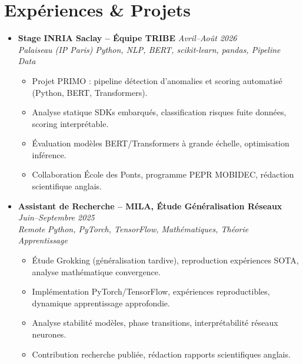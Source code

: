 \documentclass[a4paper,11pt]{article}
\begin{document}
\section{Exp\'eriences \& Projets}
\begin{itemize}[leftmargin=*, label={-}]
    \item \textbf{Stage INRIA Saclay -- \'Equipe TRIBE} \hfill \textit{Avril--Ao\^ut 2026} \\
    \textit{Palaiseau (IP Paris)} \hfill \textit{Python, NLP, BERT, scikit-learn, pandas, Pipeline Data}
    \vspace{-2pt}
        \begin{itemize}[leftmargin=0.4cm, nosep, label=\tiny$\bullet$]
            \item \small{Projet PRIMO : pipeline détection d'anomalies et scoring automatisé (Python, BERT, Transformers).}
            \item \small{Analyse statique SDKs embarqués, classification risques fuite données, scoring interprétable.}
            \item \small{\'Evaluation modèles BERT/Transformers à grande échelle, optimisation inférence.}
            \item \small{Collaboration École des Ponts, programme PEPR MOBIDEC, rédaction scientifique anglais.}
        \end{itemize}
    \vspace{3pt}
    \item \textbf{Assistant de Recherche -- MILA, \'Etude G\'en\'eralisation R\'eseaux} \hfill \textit{Juin--Septembre 2025} \\
    \textit{Remote} \hfill \textit{Python, PyTorch, TensorFlow, Mathématiques, Théorie Apprentissage}
    \vspace{-2pt}
        \begin{itemize}[leftmargin=0.4cm, nosep, label=\tiny$\bullet$]
            \item \small{Étude Grokking (généralisation tardive), reproduction expériences SOTA, analyse mathématique convergence.}
            \item \small{Implémentation PyTorch/TensorFlow, expériences reproductibles, dynamique apprentissage approfondie.}
            \item \small{Analyse stabilité modèles, phase transitions, interprétabilité réseaux neurones.}
            \item \small{Contribution recherche publiée, rédaction rapports scientifiques anglais.}
        \end{itemize}

\end{itemize}
\end{document}
